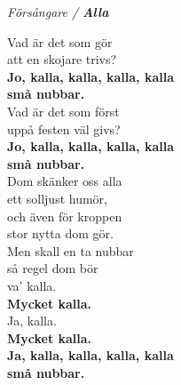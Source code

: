 \documentclass[a6paper, 10pt, twoside]{article}
\begin{document}
\newpage
\noindent
\begin{center}
\textit{Försångare / \textbf{Alla}}
\end{center}
\begin{lyrics}
Vad är det som gör \\
att en skojare trivs? \\
\textbf{Jo, kalla, kalla, kalla, kalla \\
små nubbar. \\}
Vad är det som först \\
uppå festen väl givs? \\
\textbf{Jo, kalla, kalla, kalla, kalla \\
små nubbar. \\}
Dom skänker oss alla \\
ett solljust humör, \\
och även för kroppen \\
stor nytta dom gör. \\
Men skall en ta nubbar \\
så regel dom bör \\
va' kalla. \\
\textbf{Mycket kalla.\\}
Ja, kalla. \\
\textbf{Mycket kalla.\\
Ja, kalla, kalla, kalla, kalla \\
små nubbar. }
\end{lyrics}
\end{document}
